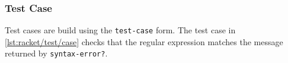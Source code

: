 

\subsubsection{Test Case}

Test cases are build using the \lstinline[language=lisp]{test-case} form.
The test case in \autoref{lst:racket/test/case} checks that the regular expression matches the message returned by \lstinline{syntax-error?}.


